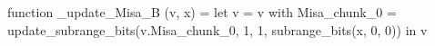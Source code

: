 function _update_Misa_B (v, x) = let v = { v with Misa_chunk_0 = update_subrange_bits(v.Misa_chunk_0, 1, 1, subrange_bits(x, 0, 0)) } in
  v
